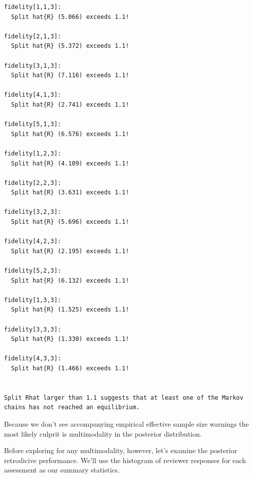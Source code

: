 \documentclass[
  letterpaper,
  DIV=11,
  numbers=noendperiod]{scrartcl}
\begin{document}
\begin{verbatim}
fidelity[1,1,3]:
  Split hat{R} (5.066) exceeds 1.1!

fidelity[2,1,3]:
  Split hat{R} (5.372) exceeds 1.1!

fidelity[3,1,3]:
  Split hat{R} (7.116) exceeds 1.1!

fidelity[4,1,3]:
  Split hat{R} (2.741) exceeds 1.1!

fidelity[5,1,3]:
  Split hat{R} (6.576) exceeds 1.1!

fidelity[1,2,3]:
  Split hat{R} (4.109) exceeds 1.1!

fidelity[2,2,3]:
  Split hat{R} (3.631) exceeds 1.1!

fidelity[3,2,3]:
  Split hat{R} (5.696) exceeds 1.1!

fidelity[4,2,3]:
  Split hat{R} (2.195) exceeds 1.1!

fidelity[5,2,3]:
  Split hat{R} (6.132) exceeds 1.1!

fidelity[1,3,3]:
  Split hat{R} (1.525) exceeds 1.1!

fidelity[3,3,3]:
  Split hat{R} (1.330) exceeds 1.1!

fidelity[4,3,3]:
  Split hat{R} (1.466) exceeds 1.1!


Split Rhat larger than 1.1 suggests that at least one of the Markov
chains has not reached an equilibrium.
\end{verbatim}

Because we don't see accompanying empirical effective sample size
warnings the most likely culprit is multimodality in the posterior
distribution.

Before exploring for any multimodality, however, let's examine the
posterior retrodicive performance. We'll use the histogram of reviewer
responses for each assessment as our summary statistics.
\end{document}
